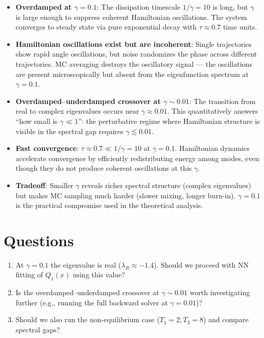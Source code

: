 \documentclass[11pt]{article}
\begin{document}
\begin{itemize}
\item \textbf{Overdamped at $\gamma = 0.1$}: The dissipation timescale $1/\gamma = 10$ is long, but $\gamma$ is large enough to suppress coherent Hamiltonian oscillations. The system converges to steady state via pure exponential decay with $\tau \approx 0.7$ time units.

\item \textbf{Hamiltonian oscillations exist but are incoherent}: Single trajectories show rapid angle oscillations, but noise randomizes the phase across different trajectories. MC averaging destroys the oscillatory signal --- the oscillations are present microscopically but absent from the eigenfunction spectrum at $\gamma = 0.1$.

\item \textbf{Overdamped--underdamped crossover at $\gamma \sim 0.01$}: The transition from real to complex eigenvalues occurs near $\gamma \approx 0.01$. This quantitatively answers ``how small is $\gamma \ll 1$'': the perturbative regime where Hamiltonian structure is visible in the spectral gap requires $\gamma \lesssim 0.01$.

\item \textbf{Fast convergence}: $\tau \approx 0.7 \ll 1/\gamma = 10$ at $\gamma = 0.1$. Hamiltonian dynamics accelerate convergence by efficiently redistributing energy among modes, even though they do not produce coherent oscillations at this $\gamma$.

\item \textbf{Tradeoff}: Smaller $\gamma$ reveals richer spectral structure (complex eigenvalues) but makes MC sampling much harder (slower mixing, longer burn-in). $\gamma = 0.1$ is the practical compromise used in the theoretical analysis.
\end{itemize}

\section{Questions}

\begin{enumerate}
\item At $\gamma = 0.1$ the eigenvalue is real ($\lambda_R \approx -1.4$). Should we proceed with NN fitting of $Q_1(x)$ using this value?
\item Is the overdamped--underdamped crossover at $\gamma \sim 0.01$ worth investigating further (e.g., running the full backward solver at $\gamma = 0.01$)?
\item Should we also run the non-equilibrium case ($T_1 = 2, T_3 = 8$) and compare spectral gaps?
\end{enumerate}
\end{document}
